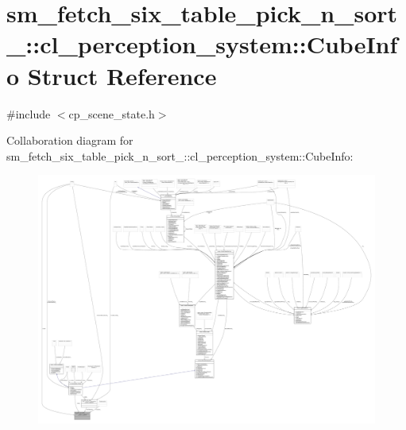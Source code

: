 \hypertarget{structsm__fetch__six__table__pick__n__sort__1_1_1cl__perception__system_1_1CubeInfo}{}\section{sm\+\_\+fetch\+\_\+six\+\_\+table\+\_\+pick\+\_\+n\+\_\+sort\+\_\+:\+:cl\+\_\+perception\+\_\+system\+:\+:Cube\+Info Struct Reference}
\label{structsm__fetch__six__table__pick__n__sort__1_1_1cl__perception__system_1_1CubeInfo}


{\ttfamily \#include $<$cp\+\_\+scene\+\_\+state.\+h$>$}



Collaboration diagram for sm\+\_\+fetch\+\_\+six\+\_\+table\+\_\+pick\+\_\+n\+\_\+sort\+\_\+:\+:cl\+\_\+perception\+\_\+system\+:\+:Cube\+Info\+:
\nopagebreak
\begin{figure}[H]
\begin{center}
\leavevmode
\includegraphics[width=350pt]{structsm__fetch__six__table__pick__n__sort__1_1_1cl__perception__system_1_1CubeInfo__coll__graph}
\end{center}
\end{figure}
